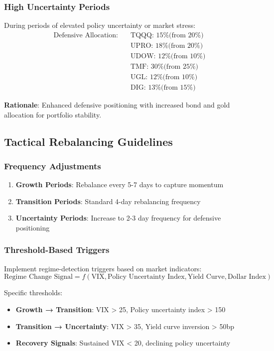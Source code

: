 \documentclass[onecolumn,11pt]{IEEEtran}
\begin{document}
\subsubsection{High Uncertainty Periods}
During periods of elevated policy uncertainty or market stress:
\begin{align}
\text{Defensive Allocation:} \quad &\text{TQQQ: 15\% (from 20\%)} \\
&\text{UPRO: 18\% (from 20\%)} \\
&\text{UDOW: 12\% (from 10\%)} \\
&\text{TMF: 30\% (from 25\%)} \\
&\text{UGL: 12\% (from 10\%)} \\
&\text{DIG: 13\% (from 15\%)}
\end{align}

\textbf{Rationale}: Enhanced defensive positioning with increased bond and gold allocation for portfolio stability.

\subsection{Tactical Rebalancing Guidelines}

\subsubsection{Frequency Adjustments}
\begin{enumerate}
    \item \textbf{Growth Periods}: Rebalance every 5-7 days to capture momentum
    \item \textbf{Transition Periods}: Standard 4-day rebalancing frequency
    \item \textbf{Uncertainty Periods}: Increase to 2-3 day frequency for defensive positioning
\end{enumerate}

\subsubsection{Threshold-Based Triggers}
Implement regime-detection triggers based on market indicators:
\begin{equation}
\text{Regime Change Signal} = f(\text{VIX}, \text{Policy Uncertainty Index}, \text{Yield Curve}, \text{Dollar Index})
\end{equation}

Specific thresholds:
\begin{itemize}
    \item \textbf{Growth → Transition}: VIX > 25, Policy uncertainty index > 150
    \item \textbf{Transition → Uncertainty}: VIX > 35, Yield curve inversion > 50bp
    \item \textbf{Recovery Signals}: Sustained VIX < 20, declining policy uncertainty
\end{itemize}
\end{document}
